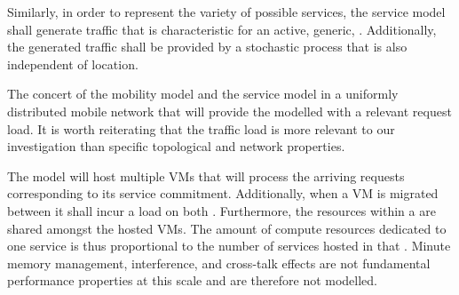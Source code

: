 Similarly, in order to represent the variety of possible services, the service model shall generate traffic that is characteristic for an active, generic, \ue{}. Additionally, the generated traffic shall be provided by a stochastic process that is also independent of location.

The concert of the mobility model and the service model in a uniformly distributed mobile network that will provide the modelled \dcs{} with a relevant request load. It is worth reiterating that the traffic load is more relevant to our investigation than specific topological and network properties.

The \dc{} model will host multiple VMs that will process the arriving requests corresponding to its service commitment. Additionally, when a VM is migrated between \dcs{} it shall incur a load on both \dcs{}. Furthermore, the resources within a \dc{} are shared amongst the hosted VMs. The amount of compute resources dedicated to one service is thus proportional to the number of services hosted in that \dc{}.  Minute memory management, interference, and cross-talk effects are not fundamental performance properties at this scale and are therefore not modelled.
